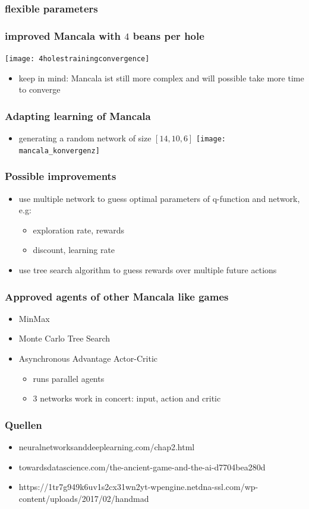 \documentclass{beamer}
\begin{document}
\begin{frame}
\frametitle{flexible parameters}

\end{frame}

 \begin{frame}
\frametitle{improved Mancala with $4$ beans per hole}
 \texttt{[image: 4holestrainingconvergence]}
\begin{itemize}
\item keep in mind: Mancala ist still more complex and will possible take more time to converge
\end{itemize}
 \end{frame}

\begin{frame} 
\frametitle{Adapting learning of Mancala}
\begin{itemize}
\item generating a random network of size $[14,10,6]$
\texttt{[image: mancala\_konvergenz]}
\end{itemize}
\end{frame}
\begin{frame}
\frametitle{Possible improvements}
\begin{itemize}
\item use multiple network to guess optimal parameters of q-function and network, e.g:
\begin{itemize}
\item exploration rate, rewards
\item discount, learning rate
\end{itemize}
\item use tree search algorithm to guess rewards over multiple future actions
\end{itemize}
\end{frame}
\begin{frame}
\frametitle{Approved agents of other Mancala like games}
\begin{itemize}
\item MinMax
\item Monte Carlo Tree Search
\item Asynchronous Advantage Actor-Critic
\begin{itemize}
\item runs parallel agents
\item 3 networks work in concert: input, action and critic
\end{itemize}
\end{itemize}
\end{frame}
\begin{frame}
\frametitle{Quellen}
\begin{itemize}
\item neuralnetworksanddeeplearning.com/chap2.html
\item towardsdatascience.com/the-ancient-game-and-the-ai-d7704bea280d
\item https://1tr7g949k6uv1s2cx31wn2yt-wpengine.netdna-ssl.com/wp-content/uploads/2017/02/handmad
\end{itemize}
\end{frame}
\end{document}
